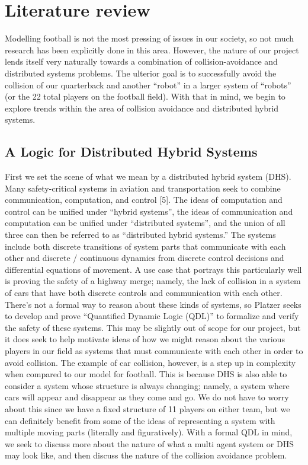 
\newpage

\section{Literature review}

\quad Modelling football is not the most pressing of issues in our society, so not much research has been explicitly done in this area. However, the nature of our project lends itself very naturally towards a combination of collision-avoidance and distributed systems problems. The ulterior goal is to successfully avoid the collision of our quarterback and another “robot” in a larger system of “robots” (or the 22 total players on the football field). With that in mind, we begin to explore trends within the area of collision avoidance and distributed hybrid systems. 

\subsection{A Logic for Distributed Hybrid Systems}
\quad First we set the scene of what we mean by a distributed hybrid system (DHS). Many safety-critical systems in aviation and transportation seek to combine communication, computation, and control [5]. The ideas of computation and control can be unified under “hybrid systems”, the ideas of communication and computation can be unified under “distributed systems”, and the union of all three can then be referred to as “distributed hybrid systems.” The systems include both discrete transitions of system parts that communicate with each other and discrete / continuous dynamics from discrete control decisions and differential equations of movement. A use case that portrays this particularly well is proving the safety of a highway merge; namely, the lack of collision in a system of cars that have both discrete controls and communication with each other. There’s not a formal way to reason about these kinds of systems, so Platzer seeks to develop and prove “Quantified Dynamic Logic (QDL)” to formalize and verify the safety of these systems. This may be slightly out of scope for our project, but it does seek to help motivate ideas of how we might reason about the various players in our field as systems that must communicate with each other in order to avoid collision. The example of car collision, however, is a step up in complexity when compared to our model for football. This is because DHS is also able to consider a system whose structure is always changing; namely, a system where cars will appear and disappear as they come and go. We do not have to worry about this since we have a fixed structure of 11 players on either team, but we can definitely benefit from some of the ideas of representing a system with multiple moving parts (literally and figuratively). With a formal QDL in mind, we seek to discuss more about the nature of what a multi agent system or DHS may look like, and then discuss the nature of the collision avoidance problem. 

